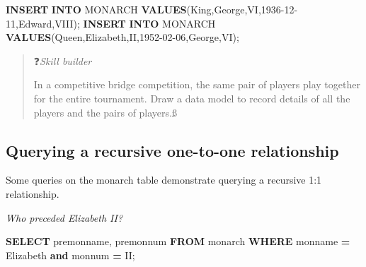 \documentclass[
]{article}
\newenvironment{Shaded}{\begin{snugshade}}{\end{snugshade}}
\newcommand{\KeywordTok}[1]{\textcolor[rgb]{0.13,0.29,0.53}{\textbf{#1}}}
\newcommand{\NormalTok}[1]{#1}
\newcommand{\OperatorTok}[1]{\textcolor[rgb]{0.81,0.36,0.00}{\textbf{#1}}}
\newcommand{\StringTok}[1]{\textcolor[rgb]{0.31,0.60,0.02}{#1}}
\begin{document}
\begin{Shaded}
\begin{Highlighting}[]
\KeywordTok{INSERT} \KeywordTok{INTO}\NormalTok{ MONARCH }\KeywordTok{VALUES}\NormalTok{(}\StringTok{\textquotesingle{}King\textquotesingle{}}\NormalTok{,}\StringTok{\textquotesingle{}George\textquotesingle{}}\NormalTok{,}\StringTok{\textquotesingle{}VI\textquotesingle{}}\NormalTok{,}\StringTok{\textquotesingle{}1936{-}12{-}11\textquotesingle{}}\NormalTok{,}\StringTok{\textquotesingle{}Edward\textquotesingle{}}\NormalTok{,}\StringTok{\textquotesingle{}VIII\textquotesingle{}}\NormalTok{);}
\KeywordTok{INSERT} \KeywordTok{INTO}\NormalTok{ MONARCH }\KeywordTok{VALUES}\NormalTok{(}\StringTok{\textquotesingle{}Queen\textquotesingle{}}\NormalTok{,}\StringTok{\textquotesingle{}Elizabeth\textquotesingle{}}\NormalTok{,}\StringTok{\textquotesingle{}II\textquotesingle{}}\NormalTok{,}\StringTok{\textquotesingle{}1952{-}02{-}06\textquotesingle{}}\NormalTok{,}\StringTok{\textquotesingle{}George\textquotesingle{}}\NormalTok{,}\StringTok{\textquotesingle{}VI\textquotesingle{}}\NormalTok{);}
\end{Highlighting}
\end{Shaded}

\begin{quote}
❓\emph{Skill builder}

In a competitive bridge competition, the same pair of players play
together for the entire tournament. Draw a data model to record
details of all the players and the pairs of players.ß
\end{quote}

\hypertarget{querying-a-recursive-one-to-one-relationship}{%
\subsection*{Querying a recursive one-to-one relationship}\label{querying-a-recursive-one-to-one-relationship}}

Some queries on the monarch table demonstrate querying a recursive 1:1
relationship.

\emph{Who preceded Elizabeth II?}

\begin{Shaded}
\begin{Highlighting}[]
\KeywordTok{SELECT}\NormalTok{ premonname, premonnum }\KeywordTok{FROM}\NormalTok{ monarch}
    \KeywordTok{WHERE}\NormalTok{ monname }\OperatorTok{=} \StringTok{\textquotesingle{}Elizabeth\textquotesingle{}} \KeywordTok{and}\NormalTok{ monnum }\OperatorTok{=} \StringTok{\textquotesingle{}II\textquotesingle{}}\NormalTok{;}
\end{Highlighting}
\end{Shaded}
\end{document}
